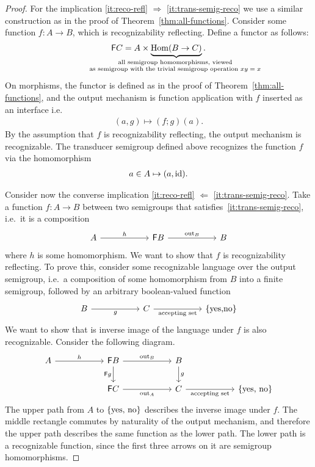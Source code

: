\begin{proof}
    For the implication \ref{it:reco-refl} $\Rightarrow$ \ref{it:trans-semig-reco} we  use a similar construction as in the proof of Theorem~\ref{thm:all-functions}.
    Consider some function $f : A \to B$, which is recognizability reflecting. Define  a functor as follows:
    \begin{align*}
    \functor C = A \times \myunderbrace{\mathrm{Hom}(B \to  C)}{all  semigroup  homomorphisms, viewed \\ as semigroup 
    with the trivial semigroup operation $xy = x$}.
    \end{align*}
    On morphisms, the functor is defined as in the proof of Theorem~\ref{thm:all-functions}, and the output mechanism  is function application with $f$ inserted as an interface i.e.
    \begin{align*}
        (a,g) \mapsto (f;g)(a).
    \end{align*}
    By the assumption that $f$ is recognizability reflecting, the output mechanism is recognizable.
    The transducer semigroup defined above recognizes the function $f$ via the homomorphism 
    \begin{align*}
    a \in A  \mapsto  (a,\mathrm{id}).
    \end{align*} 
    
Consider now the converse implication \ref{it:reco-refl} $\Leftarrow$ \ref{it:trans-semig-reco}. Take a function $f : A \to B$ between two semigroups that satisfies~\ref{it:trans-semig-reco}, i.e.~it is a composition 
\[\begin{tikzcd}
    [column sep=2cm]
	A & {\functor B} & B 
	\arrow["h", from=1-1, to=1-2]
	\arrow["\outfun_{B}", from=1-2, to=1-3]
\end{tikzcd}\]
where $h$ is some homomorphism. We want to show that $f$ is recognizability reflecting. To prove this, consider some recognizable language over the output semigroup, i.e.~a composition of some homomorphism from $B$ into a finite semigroup, followed by an arbitrary boolean-valued function
\[
\begin{tikzcd}
    [column sep=2cm]
B 
\ar[r,"g"']
&
C
\ar[r,"\text{accepting set}"']
&
\set{\text{yes,no}}
\end{tikzcd}
\]
We want to show that is inverse image of the language under $f$ is also recognizable. Consider the following diagram. 
\[\begin{tikzcd}
    [column sep=2cm]
	A & {\functor B} & B \\
	& {\functor C} & C & \set{\text{yes, no}}
	\arrow["h", from=1-1, to=1-2]
	\arrow["\outfun_B", from=1-2, to=1-3]
	\arrow["{\functor g}"', from=1-2, to=2-2]
	\arrow["\outfun_A"', from=2-2, to=2-3]
	\arrow["g", from=1-3, to=2-3]
	\arrow["\text{accepting set}"', from=2-3, to=2-4]
\end{tikzcd}\]
The upper path from $A$ to $\{\text{yes, no}\}$ describes the inverse image under $f$. 
 The middle rectangle commutes by naturality of the output mechanism, and therefore the upper path describes the same function as the lower path. The lower path is a recognizable function, since the first three arrows on it are semigroup homomorphisms.
\end{proof}


